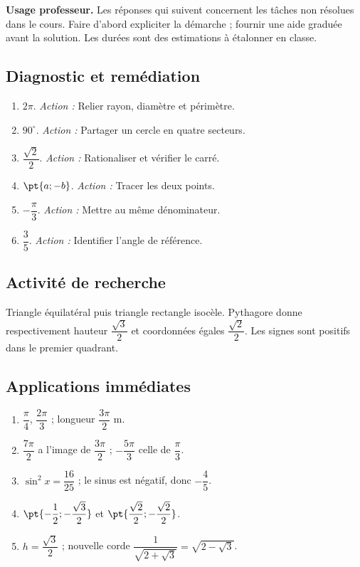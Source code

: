 \label{C10-CORR}
\textbf{Usage professeur.} Les réponses qui suivent concernent les tâches non résolues dans le cours. Faire d’abord expliciter la démarche ; fournir une aide graduée avant la solution. Les durées sont des estimations à étalonner en classe.
\subsection*{Diagnostic et remédiation}
\begin{enumerate}
\item $2\pi$. \textit{Action :} Relier rayon, diamètre et périmètre.
\item $90^\circ$. \textit{Action :} Partager un cercle en quatre secteurs.
\item $\dfrac{\sqrt 2}{2}$. \textit{Action :} Rationaliser et vérifier le carré.
\item $\pt{a;-b}$. \textit{Action :} Tracer les deux points.
\item $-\dfrac{\pi}{3}$. \textit{Action :} Mettre au même dénominateur.
\item $\dfrac{3}{5}$. \textit{Action :} Identifier l’angle de référence.
\end{enumerate}
\subsection*{Activité de recherche}
Triangle équilatéral puis triangle rectangle isocèle. Pythagore donne respectivement hauteur $\dfrac{\sqrt 3}{2}$ et coordonnées égales $\dfrac{\sqrt 2}{2}$. Les signes sont positifs dans le premier quadrant.
\subsection*{Applications immédiates}
\begin{enumerate}
\item $\dfrac{\pi}{4}$, $\dfrac{2\pi}{3}$ ; longueur $\dfrac{3\pi}{2}$ m.
\item $\dfrac{7\pi}{2}$ a l’image de $\dfrac{3\pi}{2}$ ; $-\dfrac{5\pi}{3}$ celle de $\dfrac{\pi}{3}$.
\item $\sin ^2x=\dfrac{16}{25}$ ; le sinus est négatif, donc $-\dfrac{4}{5}$.
\item $\pt{-\dfrac{1}{2};-\dfrac{\sqrt 3}{2}}$ et $\pt{\dfrac{\sqrt 2}{2};-\dfrac{\sqrt 2}{2}}$.
\item $h=\dfrac{\sqrt 3}{2}$ ; nouvelle corde $\dfrac{1}{\sqrt {2+\sqrt3}}=\sqrt {2-\sqrt3}$.
\end{enumerate}

